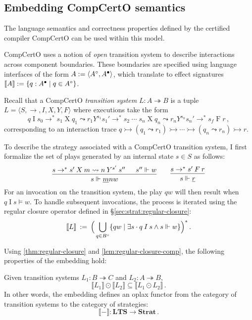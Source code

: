 \subsection{Embedding CompCertO semantics}

The language semantics and correctness properties
defined by the certified compiler CompCertO
can be used within this model.

CompCertO
uses a notion of \emph{open} transition system
to describe interactions across component boundaries.
These boundaries are specified using
language interfaces of the form
$A := \langle A^\circ, A^\bullet \rangle$,
which translate to effect signatures
$\llbracket A \rrbracket := \{ q : A^\bullet \mid q \in A^\circ \}$.

Recall that
a CompCertO \emph{transition system} $L : A \twoheadrightarrow B$
is a tuple $L = \langle S, {\rightarrow}, I, X, Y, F \rangle$
where executions take the form
\[
  q \mathrel{I} s_0 \rightarrow^*
  s_1 \mathrel{X} q_1 \leadsto
  r_1 \mathrel{Y^{s_1}} s_1' \rightarrow^*
  s_2 \mathrel{\cdots}
  s_n \mathrel{X} q_n \leadsto
  r_n \mathrel{Y^{s_n}} s_n' \rightarrow^*
  s_f \mathrel{F} r
  \,,
\]
corresponding to an interaction trace
$
q \rightarrowtail
(q_1 \leadsto r_1) \rightarrowtail
\cdots \rightarrowtail
(q_n \leadsto r_n) \rightarrowtail
r
$.

To describe the strategy associated with a CompCertO transition system,
I first formalize the set of plays generated by an internal state $s \in S$ as follows:
\[
  \begin{prooftree}
    \hypo{s \rightarrow^* s' \: X \: m \leadsto n \: Y^{s'} \: s''}
    \hypo{s'' \Vdash w}
    \infer2{s \Vdash \underline{m}nw}
  \end{prooftree}
  \qquad
  \begin{prooftree}
    \hypo{s \rightarrow^* s' \: F \: r}
    \infer1{s \Vdash \underline{r}}
  \end{prooftree}
\]
For an invocation on the transition system,
the play $qw$ will then result when $q \mathrel{I} s \vDash w$.
To handle subsequent invocations,
the process is iterated using the regular closure operator
defined in \S\ref{sec:strat:regular-closure}:
\[
  \llbracket L \rrbracket \: := \:
  \Big(\bigcup_{q \in B^\circ} \{ qw \mid \exists s \cdot q \: I \: s \wedge s \Vdash w \} \Big)^*
  \,.
\]

Using \autoref{thm:regular-closure} and \autoref{lem:regular-closure-comp},
the following properties of the embedding hold:
\begin{theorem}
  \label{thm:strat:embedding}
  Given transition systems $L_1: B \twoheadrightarrow C$ and $L_2: A \twoheadrightarrow B$,
  \[
    \llbracket L_1 \rrbracket \odot \llbracket L_2 \rrbracket
    \subseteq \llbracket L_1 \odot L_2 \rrbracket
    \,.
  \]
  In other words,
  the embedding defines an oplax functor
  from the category of transition systems
  to the category of strategies:
  \[
    \llbracket - \rrbracket : \mathbf{LTS} \rightarrow \mathbf{Strat} \,.
  \]
\end{theorem}

